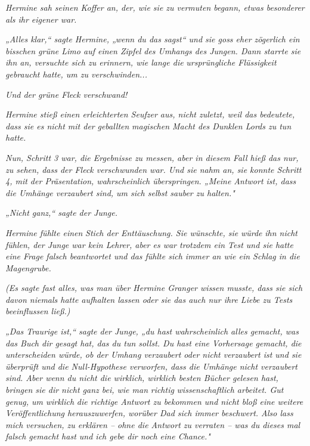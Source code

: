 {\emph{Hermine sah seinen Koffer an, der, wie sie zu vermuten begann, etwas besonderer als ihr eigener war.}

\emph{„Alles klar,“ sagte Hermine, „wenn du das sagst“ und sie goss eher zögerlich ein bisschen grüne Limo auf einen Zipfel des Umhangs des Jungen. Dann starrte sie ihn an, versuchte sich zu erinnern, wie lange die} \emph{ursprüngliche Flüssigkeit gebraucht hatte, um zu verschwinden...}

\emph{Und der grüne Fleck verschwand!}

\emph{Hermine stieß einen erleichterten Seufzer aus, nicht zuletzt, weil das bedeutete, dass sie es nicht mit der} \emph{geballten} \emph{magischen Macht des Dunklen Lords zu tun hatte.}

\emph{Nun, Schritt 3 war, die Ergebnisse zu messen, aber in diesem Fall hieß das nur, zu sehen, dass der Fleck verschwunden war. Und sie nahm an, sie konnte Schritt 4, mit der Präsentation, wahrscheinlich überspringen. „Meine Antwort ist, dass die Umhänge verzaubert sind, um sich selbst sauber zu halten."}

\emph{„Nicht ganz,“ sagte der Junge.}

\emph{Hermine fühlte einen} \emph{Stich der Enttäuschung. Sie wünschte, sie} \emph{\emph{würde}} \emph{ihn nicht fühlen, der Junge war kein Lehrer, aber es war trotzdem ein Test und sie hatte eine Frage falsch beantwortet und das fühlte sich immer an wie ein Schlag in die Magengrube.}

\emph{(Es sagte fast alles, was man über Hermine Granger wissen musste, dass sie sich davon niemals hatte aufhalten lassen oder sie das auch nur ihre Liebe zu Tests beeinflussen ließ.)}

\emph{„Das Traurige ist,“ sagte der Junge, „du hast wahrscheinlich alles gemacht, was das Buch dir gesagt hat, das du tun sollst. Du hast eine Vorhersage gemacht, die unterscheiden würde, ob der Umhang verzaubert oder nicht verzaubert ist und sie überprüft und die Null-Hypothese verworfen, dass die Umhänge nicht verzaubert sind. Aber wenn du nicht die wirklich, wirklich besten Bücher gelesen hast, bringen sie dir nicht ganz bei, wie man} \emph{\emph{richtig}} \emph{wissenschaftlich arbeitet. Gut genug, um} \emph{\emph{wirklich}} \emph{die richtige Antwort zu bekommen und nicht bloß eine weitere Veröffentlichung herauszuwerfen, worüber Dad sich immer beschwert. Also lass mich versuchen, zu erklären -- ohne die Antwort zu verraten -- was du dieses mal falsch gemacht hast und ich gebe dir noch eine Chance."}

}
